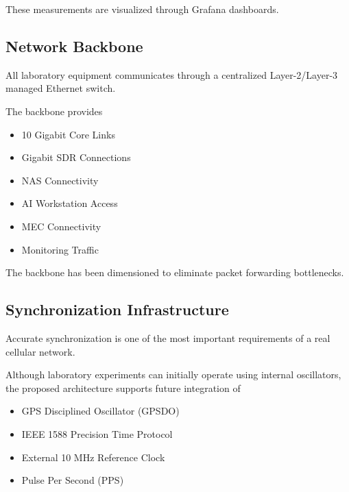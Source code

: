 \documentclass[12pt,a4paper]{article}\usepackage[a4paper,margin=1in]{geometry}\usepackage{graphicx}\usepackage{longtable}\usepackage{booktabs}\usepackage{hyperref}\usepackage{enumitem}\usepackage{amsmath}\usepackage{tikz}\usepackage{pgfgantt}\usepackage{setspace}\setstretch{1.15}\usetikzlibrary{positioning,arrows.meta,shapes.geometric}
\begin{document}
	These measurements are visualized through Grafana dashboards.
	
	
	\subsection{Network Backbone}
	
	All laboratory equipment communicates through a centralized Layer-2/Layer-3 managed Ethernet switch.
	
	The backbone provides
	
	\begin{itemize}
		
		\item 10 Gigabit Core Links
		
		\item Gigabit SDR Connections
		
		\item NAS Connectivity
		
		\item AI Workstation Access
		
		\item MEC Connectivity
		
		\item Monitoring Traffic
		
	\end{itemize}
	
	The backbone has been dimensioned to eliminate packet forwarding bottlenecks.
	
	
	\subsection{Synchronization Infrastructure}
	
	Accurate synchronization is one of the most important requirements of a real cellular network.
	
	Although laboratory experiments can initially operate using internal oscillators, the proposed architecture supports future integration of
	
	\begin{itemize}
		
		\item GPS Disciplined Oscillator (GPSDO)
		
		\item IEEE 1588 Precision Time Protocol
		
		\item External 10 MHz Reference Clock
		
		\item Pulse Per Second (PPS)
		
	\end{itemize}
	
\end{document}
